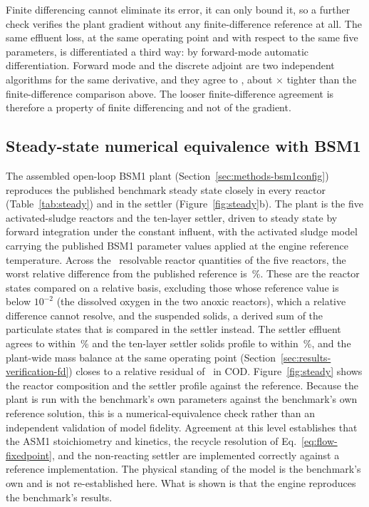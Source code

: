 \documentclass{article}
\begin{document}
Finite differencing cannot eliminate its error, it can only bound it, so a further check verifies the plant gradient without any finite-difference reference at all. The same effluent loss, at the same operating point and with respect to the same five parameters, is differentiated a third way: by forward-mode automatic differentiation. Forward mode and the discrete adjoint are two independent algorithms for the same derivative, and they agree to \VerifPlantFwdRevRel, about \VerifFwdRevRatio$\times$ tighter than the finite-difference comparison above. The looser finite-difference agreement is therefore a property of finite differencing and not of the gradient.

\subsection{Steady-state numerical equivalence with BSM1}
\label{sec:results-steady}

The assembled open-loop BSM1 plant (Section~\ref{sec:methods-bsm1config}) reproduces the published benchmark steady state closely in every reactor (Table~\ref{tab:steady}) and in the settler (Figure~\ref{fig:steady}b). The plant is the five activated-sludge reactors and the ten-layer settler, driven to steady state by forward integration under the constant influent, with the activated sludge model carrying the published BSM1 parameter values applied at the engine reference temperature. Across the \SteadyNquant\ resolvable reactor quantities of the five reactors, the worst relative difference from the published reference is \SteadyReactorWorstPct\,\%. These are the reactor states compared on a relative basis, excluding those whose reference value is below \(10^{-2}\) (the dissolved oxygen in the two anoxic reactors), which a relative difference cannot resolve, and the suspended solids, a derived sum of the particulate states that is compared in the settler instead. The settler effluent agrees to within \SteadyEffWorstPct\,\% and the ten-layer settler solids profile to within \SteadyTSSWorstPct\,\%, and the plant-wide mass balance at the same operating point (Section~\ref{sec:results-verification-fd}) closes to a relative residual of \VerifMassBalCOD\ in COD. Figure~\ref{fig:steady} shows the reactor composition and the settler profile against the reference. Because the plant is run with the benchmark's own parameters against the benchmark's own reference solution, this is a numerical-equivalence check rather than an independent validation of model fidelity. Agreement at this level establishes that the ASM1 stoichiometry and kinetics, the recycle resolution of Eq.~\eqref{eq:flow-fixedpoint}, and the non-reacting settler are implemented correctly against a reference implementation. The physical standing of the model is the benchmark's own and is not re-established here. What is shown is that the engine reproduces the benchmark's results.
\end{document}
